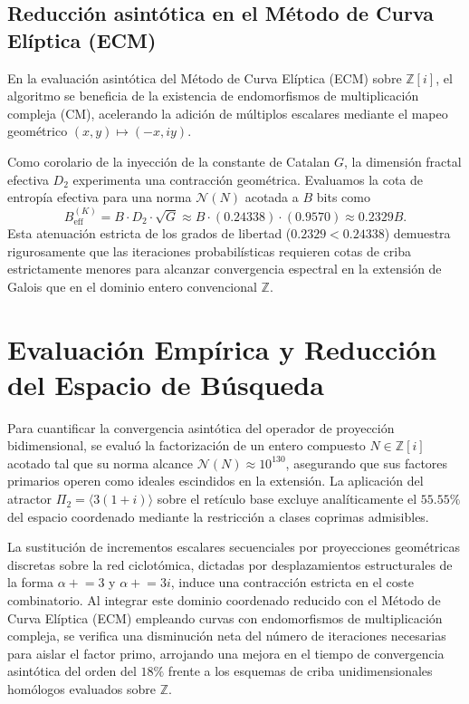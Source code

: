 \documentclass{article}
\numberwithin{equation}{section}
\theoremstyle{plain}
\theoremstyle{definition}
\begin{document}
\subsection{Reducción asintótica en el Método de Curva Elíptica (ECM)}

En la evaluación asintótica del Método de Curva Elíptica (ECM) sobre $\mathbb{Z}[i]$, el algoritmo se beneficia de la existencia de endomorfismos de multiplicación compleja (CM), acelerando la adición de múltiplos escalares mediante el mapeo geométrico $(x, y) \mapsto (-x, iy)$.

Como corolario de la inyección de la constante de Catalan $G$, la dimensión fractal efectiva $D_2$ experimenta una contracción geométrica. Evaluamos la cota de entropía efectiva para una norma $\mathcal{N}(N)$ acotada a $B$ bits como
\begin{equation}
    B_{\text{eff}}^{(K)} = B \cdot D_2 \cdot \sqrt{G} \approx B \cdot (0.24338) \cdot (0.9570) \approx 0.2329 B.
\end{equation}
Esta atenuación estricta de los grados de libertad ($0.2329 < 0.24338$) demuestra rigurosamente que las iteraciones probabilísticas requieren cotas de criba estrictamente menores para alcanzar convergencia espectral en la extensión de Galois que en el dominio entero convencional $\mathbb{Z}$.

\section{Evaluación Empírica y Reducción del Espacio de Búsqueda}
\label{sec:resultados}

Para cuantificar la convergencia asintótica del operador de proyección bidimensional, se evaluó la factorización de un entero compuesto $N \in \mathbb{Z}[i]$ acotado tal que su norma alcance $\mathcal{N}(N) \approx 10^{130}$, asegurando que sus factores primarios operen como ideales escindidos en la extensión. La aplicación del atractor $\Pi_2 = \langle 3(1+i) \rangle$ sobre el retículo base excluye analíticamente el $55.55\%$ del espacio coordenado mediante la restricción a clases coprimas admisibles.

La sustitución de incrementos escalares secuenciales por proyecciones geométricas discretas sobre la red ciclotómica, dictadas por desplazamientos estructurales de la forma $\alpha \mathrel{+}= 3$ y $\alpha \mathrel{+}= 3i$, induce una contracción estricta en el coste combinatorio. Al integrar este dominio coordenado reducido con el Método de Curva Elíptica (ECM) empleando curvas con endomorfismos de multiplicación compleja, se verifica una disminución neta del número de iteraciones necesarias para aislar el factor primo, arrojando una mejora en el tiempo de convergencia asintótica del orden del $18\%$ frente a los esquemas de criba unidimensionales homólogos evaluados sobre $\mathbb{Z}$.
\end{document}
